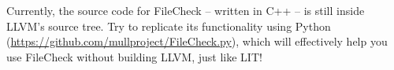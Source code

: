 Currently, the source code for FileCheck – written in C++ – is still inside LLVM's source tree. Try to replicate its functionality using Python (\url{https://github.com/mullproject/FileCheck.py}), which will effectively help you use FileCheck without building LLVM, just like LIT!